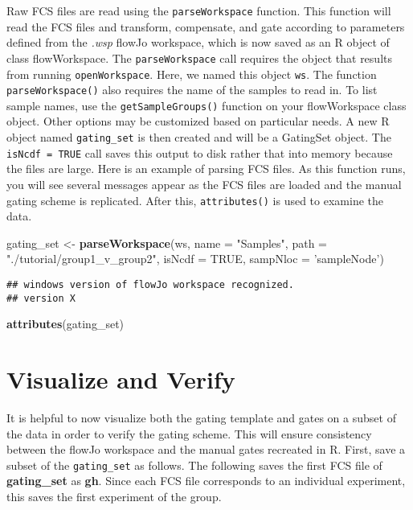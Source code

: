 \documentclass[]{book}
\newenvironment{Shaded}{\begin{snugshade}}{\end{snugshade}}
\newcommand{\DataTypeTok}[1]{\textcolor[rgb]{0.13,0.29,0.53}{#1}}
\newcommand{\KeywordTok}[1]{\textcolor[rgb]{0.13,0.29,0.53}{\textbf{#1}}}
\newcommand{\NormalTok}[1]{#1}
\newcommand{\OtherTok}[1]{\textcolor[rgb]{0.56,0.35,0.01}{#1}}
\newcommand{\StringTok}[1]{\textcolor[rgb]{0.31,0.60,0.02}{#1}}
\begin{document}
Raw FCS files are read using the \texttt{parseWorkspace} function. This function will read the FCS files and transform, compensate, and gate according to parameters defined from the \emph{.wsp} flowJo workspace, which is now saved as an R object of class flowWorkspace. The \texttt{parseWorkspace} call requires the object that results from running \texttt{openWorkspace}. Here, we named this object \texttt{ws}. The function \texttt{parseWorkspace()} also requires the name of the samples to read in. To list sample names, use the \texttt{getSampleGroups()} function on your flowWorkspace class object. Other options may be customized based on particular needs. A new R object named \texttt{gating\_set} is then created and will be a GatingSet object. The \texttt{isNcdf\ =\ TRUE} call saves this output to disk rather that into memory because the files are large. Here is an example of parsing FCS files. As this function runs, you will see several messages appear as the FCS files are loaded and the manual gating scheme is replicated. After this, \texttt{attributes()} is used to examine the data.

\begin{Shaded}
\begin{Highlighting}[]
\NormalTok{gating_set <-}\StringTok{ }\KeywordTok{parseWorkspace}\NormalTok{(ws, }\DataTypeTok{name =} \StringTok{"Samples"}\NormalTok{, }\DataTypeTok{path =} \StringTok{"./tutorial/group1_v_group2"}\NormalTok{, }\DataTypeTok{isNcdf =} \OtherTok{TRUE}\NormalTok{, }\DataTypeTok{sampNloc =} \StringTok{'sampleNode'}\NormalTok{)}
\end{Highlighting}
\end{Shaded}

\begin{verbatim}
## windows version of flowJo workspace recognized.
## version X
\end{verbatim}

\begin{Shaded}
\begin{Highlighting}[]
\KeywordTok{attributes}\NormalTok{(gating_set)}
\end{Highlighting}
\end{Shaded}

\hypertarget{visualize-and-verify}{%
\section{Visualize and Verify}\label{visualize-and-verify}}

It is helpful to now visualize both the gating template and gates on a subset of the data in order to verify the gating scheme. This will ensure consistency between the flowJo workspace and the manual gates recreated in R. First, save a subset of the \texttt{gating\_set} as follows. The following saves the first FCS file of \textbf{gating\_set} as \textbf{gh}. Since each FCS file corresponds to an individual experiment, this saves the first experiment of the group.
\end{document}

